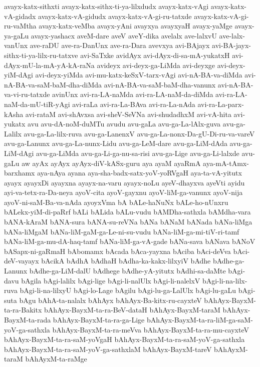 {avayx-katx-sithxti
avayx-katx-sithx-ti-ya-lilxdudx
avayx-katx-vAgi
avayx-katx-vA-gidadx
avayx-katx-vA-gidudx
avayx-katx-vA-gi-ru-tatxde
avayx-katx-vA-gi-ru-vaMtha
avayx-katx-veMba
avayx-yAni
avayxya
avayxyaH
avayx-yaMge
avayx-ya-gaLu
avayx-yashacx
aveM-dare
aveV
aveY-dika
avelalx
ave-lalxvU
ave-lalx-vanUnx
ave-raDU
ave-ra-DanUnx
ave-ra-Dara
avevxya
avi-BAjayx
avi-BA-jayx-sithx-ti-ya-lilx-ru-tatxve
avi-SaTxke
avidAyx
avi-dAyx-di-sa-mA-yukatxH
avi-dAyx-mU-la-mA-yA-kA-raNa
avideyx
avi-deyx-ga-LiMda
avi-deyxge
avi-deyx-yiM-dAgi
avi-deyx-yiMda
avi-mu-katx-keSxV-tarx-vAgi
avi-nA-BA-va-diMda
avi-nA-BA-va-saM-baM-dha-diMda
avi-nA-BA-va-saM-baM-dha-vanunx
avi-nA-BA-va-vi-ru-tatxde
avinUnx
avi-ra-LA-naMda
avi-ra-LA-naM-da-diMda
avi-ra-LA-naM-da-mU-tiR-yAgi
avi-raLa
avi-ra-La-BAva
avi-ra-La-nAda
avi-ra-La-parx-kAsha
avi-rataM
avi-shAvxsa
avi-sheV-SeVNa
avi-shudadhxM
avi-vA-hita
avi-yukatx
avu
avu-dA-noM-duMTu
avudu
avu-gaLa
avu-ga-La-lAlx-guva
avu-ga-Lalilx
avu-ga-La-lilx-ruva
avu-ga-LanenxV
avu-ga-La-nonx-Da-gU-Di-ru-va-vareV
avu-ga-Lanunx
avu-ga-La-nunx-Lidu
avu-ga-LeM-dare
avu-ga-LiM-dAda
avu-ga-LiM-dAgi
avu-ga-LiMda
avu-ga-Li-ga-nu-sa-risi
avu-ga-Lige
avu-ga-Li-lalxde
avu-gaLu
aw
ayAx
ayAyx
ayAyx-diV-kASx-guru
aya
ayaM
ayaRmA
aya-mA-tAmx-barxhamx
aya-nAya
ayana
aya-sha-badx-satx-yoV-yoRVgaH
aya-ta-vA-yitutx
ayayx
ayayxDi
ayayxna
ayayx-na-varu
ayayx-noLu
ayeV-dhayxva
ayeVti
ayidu
ayi-va-tetx-ra-Da-neya
ayoV-cita
ayoV-gayxnu
ayoV-liM-ga-vanunx
ayoV-nija
ayoV-ni-saM-Ba-va-nAda
ayoyxVma
bA
bALe-haNuNx
bALe-ho-nUnxru
bALekx-yiM-di-paRrf
bALi
bALida
bALu-vudu
bAMDha-sathxla
bAMdha-vara
bANA-kAraM
bANA-sura
bANA-su-reVNa
bANa
bANaM
bANada
bANa-liMga
bANa-liMgaM
bANa-liM-gaM-ga-Le-ni-su-vudu
bANa-liM-ga-mi-tiV-ri-tamf
bANa-liM-ga-mu-dA-haq-tamf
bANa-liM-ga-vA-gade
bANa-sava
bANava
bANoV
bASapx-ni-gaRmaH
bAbomamx
bAcada
bAca-yayxna
bAciba
bAci-deVva
bAci-deV-vayayx
bAcikA
bAdhA
bAdhaH
bAdha-ka-kakx-lilxyiV
bAdhe
bAdhe-ga-Lanunx
bAdhe-ga-LiM-dalU
bAdhege
bAdhe-yA-yitutx
bAdhi-sa-daMte
bAgi-davu
bAgila
bAgi-lalilx
bAgi-lige
bAgi-li-nalUlx
bAgi-li-nalelxV
bAgi-li-na-lilx-ruva
bAgi-li-na-lilxyU
bAgi-lo-Lage
bAgilu
bAgi-lu-ga-LalUlx
bAgi-lu-gaLu
bAgi-suta
bAgu
bAhA-ta-nalalx
bAhAyx
bAhAyx-Ba-kitx-ru-cayxteV
bAhAyx-BayxM-ta-ra-Bakitx
bAhAyx-BayxM-ta-ra-BeV-dataH
bAhAyx-BayxM-taraM
bAhAyx-BayxM-ta-rada
bAhAyx-BayxM-ta-ra-ga-Lige
bAhAyx-BayxM-ta-ra-liM-ga-saM-yoV-ga-sathxla
bAhAyx-BayxM-ta-ra-meVva
bAhAyx-BayxM-ta-ra-mu-cayxteV
bAhAyx-BayxM-ta-ra-saM-yoVgaH
bAhAyx-BayxM-ta-ra-saM-yoV-ga-sathxla
bAhAyx-BayxM-ta-ra-saM-yoV-ga-sathxlaM
bAhAyx-BayxM-tareV
bAhAyxM-taraM
bAhAyxM-ta-raMge
}
